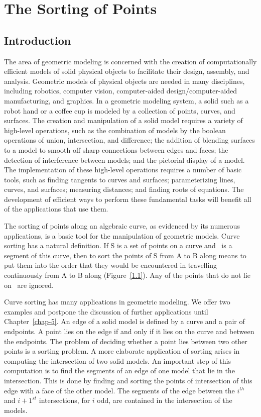 \chapter{The Sorting of Points}
\section{Introduction}
\label{chap1-sec1}

The area of geometric modeling is concerned with the creation of 
computationally efficient models 
of solid physical objects to facilitate their design, assembly, and analysis.
Geometric models of physical objects  are needed in many disciplines, including robotics,
computer vision, computer-aided design/computer-aided 
manufacturing, and graphics.
In a geometric modeling system,
a solid such as a robot hand or a coffee cup is modeled by a collection
of points, curves, and surfaces.
The creation and manipulation of a solid model requires 
a variety of high-level operations, such as the combination of models by 
the boolean operations of union, intersection, and
difference; the addition of blending surfaces to a model to smooth off sharp
connections between edges and faces; the detection of interference between
models; and the pictorial display of a model.
The implementation of these high-level operations requires a
number of basic tools,
such as finding tangents to curves and surfaces; 
parameterizing lines, curves, and surfaces; 
measuring distances; and finding roots of equations. 
The development of efficient ways to perform these fundamental
tasks will benefit all of the applications that use them.

The sorting of points along an algebraic curve, as evidenced by its
numerous applications, is a basic tool for the manipulation of
geometric models.
Curve sorting has a natural definition.
If S is a set of points on a curve and \ is a segment of this curve,
then to sort the points of S from A to B along  
means to put them into the
order that they would be encountered in travelling continuously from A to B 
along  (Figure~\ref{1.1}).
Any of the points that do not lie on \ are ignored.
%
%

Curve sorting has many applications in geometric modeling.
We offer two examples and postpone the discussion of
further applications until Chapter~\ref{chap-5}.
An edge of a solid model is defined by a 
curve and a pair of endpoints.
A point lies on the edge if and only if it lies on the curve and 
between the endpoints.
The problem of deciding 
whether a point lies between two other points is a sorting 
problem.
A more elaborate application of sorting arises 
in computing the intersection of two solid models. 
An important step of this computation
is to find the segments of an edge of one model that lie in the intersection.
This is done by finding and sorting the points of intersection 
of this edge with a face of the other model. 
The segments of the edge between the $i^{th}$ and $i+1^{st}$ intersections,
for $i$ odd, are contained in the intersection of the models.

